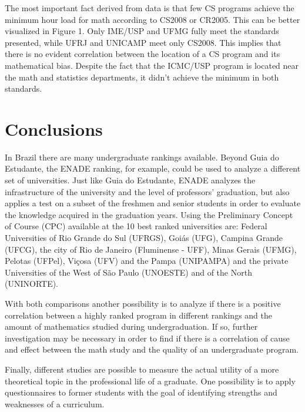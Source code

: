 \documentclass[conference]{IEEEtran}
\begin{document}
	The most important fact derived from data is that few CS programs achieve the minimum hour load for math according to CS2008 or CR2005. This can be better visualized in Figure 1. Only IME/USP and UFMG fully meet the standards presented, while UFRJ and UNICAMP meet only CS2008. This implies that there is no evident correlation between the location of a CS program and its mathematical bias. Despite the fact that the ICMC/USP program is located near the math and statistics departments, it didn't achieve the minimum in both standards.
	

\section{Conclusions}
	In Brazil there are many undergraduate rankings available. Beyond Guia do Estudante, the ENADE ranking, for example, could be used to analyze a different set of universities. Just like Guia do Estudante, ENADE analyzes the infrastructure of the university and the level of professors' graduation, but also applies a test on a subset of the freshmen and senior students in order to evaluate the knowledge acquired in the graduation years. \cite{enade_info} Using the Preliminary Concept of Course (CPC) available at \cite{enade} the 10 best ranked universities are: Federal Universities of Rio Grande do Sul (UFRGS), Goiás (UFG), Campina Grande (UFCG), the city of Rio de Janeiro (Fluminense - UFF), Minas Gerais (UFMG), Pelotas (UFPel), Viçosa (UFV) and the Pampa (UNIPAMPA) and the private Universities of the West of São Paulo (UNOESTE) and of the North (UNINORTE). 
	
	With both comparisons another possibility is to analyze if there is a positive correlation between a highly ranked program in different rankings and the amount of mathematics studied during undergraduation. If so, further investigation may be necessary in order to find if there is a correlation of cause and effect between the math study and the quality of an undergraduate program.
	
	Finally, different studies are possible to measure the actual utility of a more theoretical topic in the professional life of a graduate. One possibility is to apply questionnaires to former students with the goal of identifying strengths and weaknesses of a curriculum.


\end{document}

